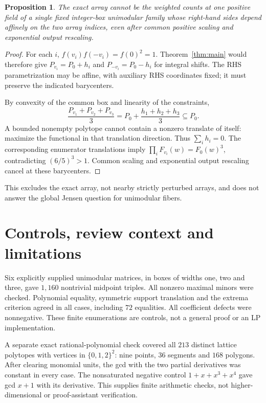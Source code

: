 \documentclass[11pt]{article}
\newtheorem{proposition}[theorem]{Proposition}
\begin{document}
\begin{proposition}\label{prop:obstruction}
The exact array cannot be the weighted counts at one positive field of a single fixed integer-box unimodular family whose right-hand sides depend affinely on the two array indices, even after common positive scaling and exponential output rescaling.
\end{proposition}
\begin{proof}
For each \(i\), \(f(v_i)f(-v_i)=f(0)^2=1\).
Theorem~\ref{thm:main} would therefore give
\(P_{v_i}=P_0+h_i\) and \(P_{-v_i}=P_0-h_i\) for integral shifts.
The RHS parametrization may be affine, with auxiliary RHS coordinates fixed; it must preserve the indicated barycenters.

By convexity of the common box and linearity of the constraints,
\[
\frac{P_{v_1}+P_{v_2}+P_{v_3}}3
=P_0+\frac{h_1+h_2+h_3}3\subseteq P_0.
\]
A bounded nonempty polytope cannot contain a nonzero translate of itself: maximize the functional in that translation direction. Thus \(\sum_i h_i=0\).
The corresponding enumerator translations imply \(\prod_i F_{v_i}(w)=F_0(w)^3\), contradicting \((6/5)^3>1\). Common scaling and exponential output rescaling cancel at these barycenters.
\end{proof}
This excludes the exact array, not nearby strictly perturbed arrays, and does not answer the global Jensen question for unimodular fibers.

\section{Controls, review context and limitations}
Six explicitly supplied unimodular matrices, in boxes of widths one, two and three, gave \(1{,}160\) nontrivial midpoint triples. All nonzero maximal minors were checked. Polynomial equality, symmetric support translation and the extrema criterion agreed in all cases, including \(72\) equalities. All coefficient defects were nonnegative. These finite enumerations are controls, not a general proof or an LP implementation.

A separate exact rational-polynomial check covered all \(213\) distinct lattice polytopes with vertices in \(\{0,1,2\}^2\): nine points, \(36\) segments and \(168\) polygons. After clearing monomial units, the gcd with the two partial derivatives was constant in every case. The nonsaturated negative control \(1+x+x^3+x^4\) gave gcd \(x+1\) with its derivative. This supplies finite arithmetic checks, not higher-dimensional or proof-assistant verification.
\end{document}
